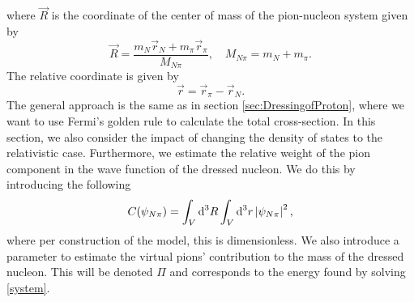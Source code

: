 where $\vec{R}$ is the coordinate of the center of mass of the pion-nucleon system given by
\begin{equation} \label{Rvec}
	\vec{R}=\frac{m_N \vec{r}_N+m_\pi \vec{r}_\pi}{M_{N\pi}}, \quad M_{N\pi} = m_N+m_\pi.
\end{equation}
The relative coordinate is given by
\begin{equation} \label{rvec}
	\vec{r} = \vec{r}_\pi-\vec{r}_N.
\end{equation}
The general approach is the same as in section \ref{sec:DressingofProton}, where we want to use Fermi's golden rule to calculate the total cross-section. In this section, we also consider the impact of changing the density of states to the relativistic case. Furthermore, we estimate the relative weight of the pion component in the wave function of the dressed nucleon. We do this by introducing the following
\begin{equation} \label{relativeweight}
	C(\psi_{N\pi}) = \int_V \text{d}^3 R \int_V \text{d}^3 r \, \abs{\psi_{N\pi}}^2,
\end{equation}
where per construction of the model, this is dimensionless. We also introduce a parameter to estimate the virtual pions' contribution to the mass of the dressed nucleon. This will be denoted $\Pi$ and corresponds to the energy found by solving \eqref{system}.

